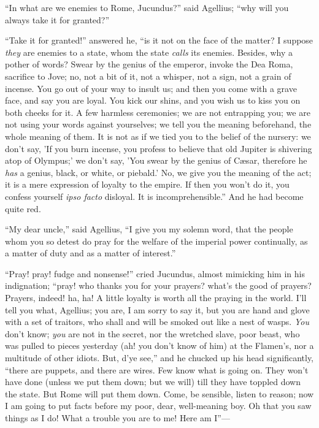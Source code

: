 ``In what are we enemies to Rome, Jucundus?'' said Agellius;
``why will you always take it for granted?''

``Take it for granted!'' answered he, ``is it not on
the face of the matter? I suppose \emph{they} are enemies to a state,
whom the state \emph{calls} its enemies. Besides, why a pother of
words? Swear by the genius of the emperor, invoke the Dea Roma,
sacrifice to Jove; no, not a bit of it, not a whisper, not a sign, not
a grain of incense. You go out of your way to insult us; and then you
come with a grave face, and say you are loyal. You kick our shins, and
you wish us to kiss you on both cheeks for it. A few harmless
ceremonies; we are not entrapping you; we are not using your words
against yourselves; we tell you the meaning beforehand, the whole
meaning of them. It is not as if we tied you to the belief of the
nursery: we don't say, 'If you burn incense, you profess to believe
that old Jupiter is shivering atop of Olympus;' we don't say, 'You
swear by the genius of Cæsar, therefore he \emph{has} a genius, black, or
white, or piebald.' No, we give you the meaning of the act; it is a
mere expression of loyalty to the empire. If then you won't do it, you
confess yourself \emph{ipso facto} disloyal. It is
incomprehensible.'' And he had become quite red.

``My dear uncle,'' said Agellius, ``I give you my
solemn word, that the people whom you so detest do pray for the
welfare of the imperial power continually, as a matter of duty and as
a matter of interest.''

``Pray! pray! fudge and nonsense!'' cried Jucundus, almost
mimicking him in his indignation; ``pray! who thanks you for your
prayers? what's the good of prayers? Prayers, indeed! ha, ha! A little
loyalty is worth all the praying in the world. I'll tell you what,
Agellius; you are, I am sorry to say it, but you are hand and glove
with a set of traitors, who shall and will be smoked out like a nest
of wasps. \emph{You} don't know; \emph{you} are not in the secret, nor
the wretched slave, poor beast, who was pulled to pieces yesterday
(ah! you don't know of him) at the Flamen's, nor a multitude of other
idiots. But, d'ye see,'' and he chucked up his head significantly,
``there are puppets, and there are wires. Few know what is going
on. They won't have done (unless we put them down; but we will) till
they have toppled down the state. But Rome will put them down. Come,
be sensible, listen to reason; now I am going to put facts before my
poor, dear, well-meaning boy. Oh that you saw things as I do! What a
trouble you are to me! Here am I''—

